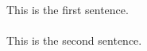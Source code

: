 \documentclass{article}
\begin{document}
This is the first sentence.\\\\
This is the second sentence.
\end{document}
